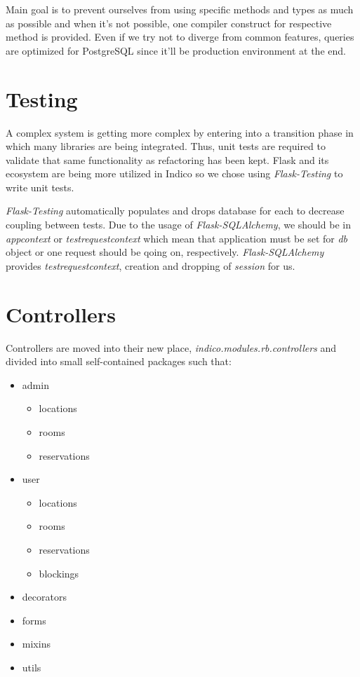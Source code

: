 Main goal is to prevent ourselves from using specific methods and types as much as possible and when it's not possible, one compiler construct for respective method is provided. Even if we try not to diverge from common features, queries are optimized for PostgreSQL since it'll be production environment at the end.

\section{Testing}

A complex system is getting more complex by entering into a transition phase in which many libraries are being integrated. Thus, unit tests are required to validate that same functionality as refactoring has been kept. Flask and its ecosystem are being more utilized in Indico so we chose using \textit{Flask-Testing} to write unit tests.

\textit{Flask-Testing} automatically populates and drops database for each to decrease coupling between tests. Due to the usage of \textit{Flask-SQLAlchemy}, we should be in \textit{app\textunderscore context} or \textit{test\textunderscore request\textunderscore context} which mean that application must be set for \textit{db} object or one request should be qoing on, respectively. \textit{Flask-SQLAlchemy} provides \textit{test\textunderscore request\textunderscore context}, creation and dropping of \textit{session} for us.

\section{Controllers}

Controllers are moved into their new place, \textit{indico.modules.rb.controllers} and divided into small self-contained packages such that:
\begin{itemize}
  \item admin
    \begin{itemize}
      \item locations
      \item rooms
      \item reservations
    \end{itemize}
  \item user
    \begin{itemize}
      \item locations
      \item rooms
      \item reservations
      \item blockings
    \end{itemize}
  \item decorators
  \item forms
  \item mixins
  \item utils
\end{itemize}

